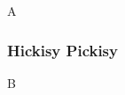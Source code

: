 \documentclass[../../main.tex]{subfiles}
\begin{document}
A

\subsubsection{Hickisy Pickisy}

B
\end{document}
